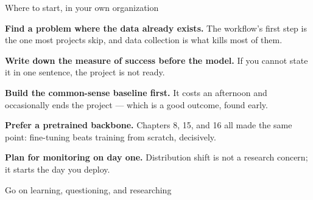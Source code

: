 \documentclass[aspectratio=169,11pt,t]{beamer}
\begin{document}
\begin{frame}[shrink=25]{Where to start, in your own organization}
\begin{isteps}
\item \textbf{Find a problem where the data already exists.} The workflow's first step is the one most projects skip, and data collection is what kills most of them.
\item \textbf{Write down the measure of success before the model.} If you cannot state it in one sentence, the project is not ready.
\item \textbf{Build the common-sense baseline first.} It costs an afternoon and occasionally ends the project --- which is a good outcome, found early.
\item \textbf{Prefer a pretrained backbone.} Chapters 8, 15, and 16 all made the same point: fine-tuning beats training from scratch, decisively.
\item \textbf{Plan for monitoring on day one.} Distribution shift is not a research concern; it starts the day you deploy.
\end{isteps}
\end{frame}

\begin{frame}[shrink=25]{Go on learning, questioning, and researching}
\begin{iquote}
\end{iquote}
\vskip 4pt
\vskip 2pt
\end{frame}
\end{document}
